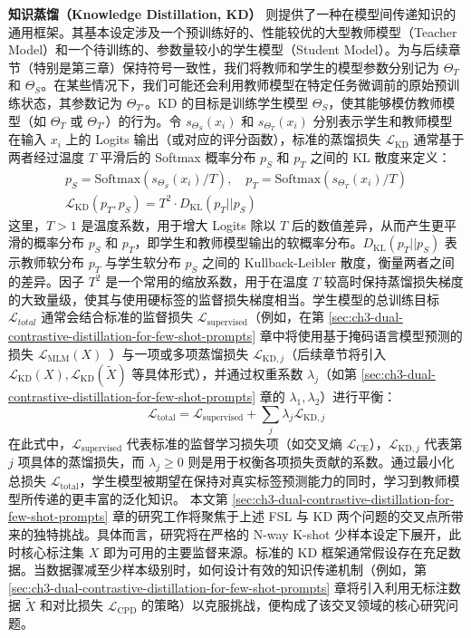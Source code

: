\documentclass[../main.tex]{subfiles}
\begin{document}
\textbf{知识蒸馏（Knowledge Distillation, KD）} 则提供了一种在模型间传递知识的通用框架。其基本设定涉及一个预训练好的、性能较优的大型教师模型（Teacher Model）和一个待训练的、参数量较小的学生模型（Student Model）。为与后续章节（特别是第三章）保持符号一致性，我们将教师和学生的模型参数分别记为 $\Theta_T$ 和 $\Theta_S$。在某些情况下，我们可能还会利用教师模型在特定任务微调前的原始预训练状态，其参数记为 $\Theta_{T'}$。KD 的目标是训练学生模型 $\Theta_S$，使其能够模仿教师模型（如 $\Theta_T$ 或 $\Theta_{T'}$）的行为。令 $s_{\Theta_S}(x_i)$ 和 $s_{\Theta_T}(x_i)$ 分别表示学生和教师模型在输入 $x_i$ 上的 Logits 输出（或对应的评分函数），标准的蒸馏损失 $\mathcal{L}_\mathrm{KD}$ 通常基于两者经过温度 $T$ 平滑后的 Softmax 概率分布 $p_S$ 和 $p_T$ 之间的 KL 散度来定义：
\begin{gather}
	p_S = \text{Softmax}(s_{\Theta_S}(x_i)/T), \quad p_T = \text{Softmax}(s_{\Theta_T}(x_i)/T) \label{eq:kd_softmax} \\
	\mathcal{L}_\mathrm{KD}(p_T, p_S) = T^2 \cdot D_\mathrm{KL}(p_T || p_S) \label{eq:kd_loss}
\end{gather}
这里，$T > 1$ 是温度系数，用于增大 Logits 除以 $T$ 后的数值差异，从而产生更平滑的概率分布 $p_S$ 和 $p_T$，即学生和教师模型输出的软概率分布。$D_\mathrm{KL}(p_T || p_S)$ 表示教师软分布 $p_T$ 与学生软分布 $p_S$ 之间的 Kullback-Leibler 散度，衡量两者之间的差异。因子 $T^2$ 是一个常用的缩放系数，用于在温度 $T$ 较高时保持蒸馏损失梯度的大致量级，使其与使用硬标签的监督损失梯度相当。学生模型的总训练目标 $\mathcal{L}_{total}$ 通常会结合标准的监督损失 $\mathcal{L}_\mathrm{supervised}$（例如，在第 \ref{sec:ch3-dual-contrastive-distillation-for-few-shot-prompts} 章中将使用基于掩码语言模型预测的损失 $\mathcal{L}_\mathrm{MLM}(X)$~\cite{bertpretraining_devlin_2019}）与一项或多项蒸馏损失 $\mathcal{L}_{\mathrm{KD}, j}$（后续章节将引入 $\mathcal{L}_\mathrm{KD}(X), \mathcal{L}_\mathrm{KD}(\tilde{X})$ 等具体形式），并通过权重系数 $\lambda_j$（如第 \ref{sec:ch3-dual-contrastive-distillation-for-few-shot-prompts} 章的 $\lambda_1, \lambda_2$）进行平衡：
\begin{equation}
	\mathcal{L}_\mathrm{total} = \mathcal{L}_\mathrm{supervised} + \sum_j \lambda_j \mathcal{L}_{\mathrm{KD}, j}
	\label{eq:kd_total_loss}
\end{equation}
在此式中，$\mathcal{L}_\mathrm{supervised}$ 代表标准的监督学习损失项（如交叉熵 $\mathcal{L}_\mathrm{CE}$），$\mathcal{L}_{\mathrm{KD}, j}$ 代表第 $j$ 项具体的蒸馏损失，而 $\lambda_j \ge 0$ 则是用于权衡各项损失贡献的系数。通过最小化总损失 $\mathcal{L}_\mathrm{total}$，学生模型被期望在保持对真实标签预测能力的同时，学习到教师模型所传递的更丰富的泛化知识\cite{distillingknowledgeneural_hinton_2015,patientknowledgedistillation_sun_2019}。
本文第 \ref{sec:ch3-dual-contrastive-distillation-for-few-shot-prompts} 章的研究工作将聚焦于上述 FSL 与 KD 两个问题的交叉点所带来的独特挑战。具体而言，研究将在严格的 N-way K-shot 少样本设定下展开，此时核心标注集 $X$ 即为可用的主要监督来源。标准的 KD 框架通常假设存在充足数据。当数据骤减至少样本级别时，如何设计有效的知识传递机制（例如，第 \ref{sec:ch3-dual-contrastive-distillation-for-few-shot-prompts} 章将引入利用无标注数据 $\tilde{X}$ 和对比损失 $\mathcal{L}_\mathrm{CPD}$ 的策略）以克服挑战，便构成了该交叉领域的核心研究问题。
\end{document}
